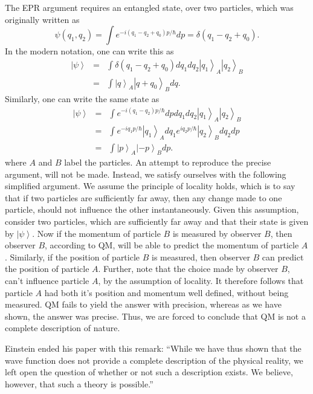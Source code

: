 
The EPR argument requires an entangled state, over two particles,
which was originally written as 
\[
\psi(q_{1},q_{2})=\int e^{-i(q_{1}-q_{2}+q_{0})p/\hbar}dp=\delta(q_{1}-q_{2}+q_{0}).
\]
In the modern notation, one can write this as 
\begin{eqnarray*}
\left|\psi\right\rangle  & = & \int\delta(q_{1}-q_{2}+q_{0})dq_{1}dq_{2}\left|q_{1}\right\rangle _{A}\left|q_{2}\right\rangle _{B}\\
 & = & \int\left|q\right\rangle _{A}\left|q+q_{0}\right\rangle _{B}dq.
\end{eqnarray*}
Similarly, one can write the same state as 
\begin{eqnarray*}
\left|\psi\right\rangle  & = & \int e^{-i(q_{1}-q_{2})p/\hbar}dpdq_{1}dq_{2}\left|q_{1}\right\rangle _{A}\left|q_{2}\right\rangle _{B}\\
 & = & \int e^{-iq_{1}p/\hbar}\left|q_{1}\right\rangle _{A}dq_{1}e^{iq_{2}p/\hbar}\left|q_{2}\right\rangle _{B}dq_{2}dp\\
 & = & \int\left|p\right\rangle _{A}\left|-p\right\rangle _{B}dp.
\end{eqnarray*}
where $A$ and $B$ label the particles. An attempt to reproduce the
precise argument, will not be made. Instead, we satisfy ourselves
with the following simplified argument. We assume the principle of
locality holds, which is to say that if two particles are sufficiently
far away, then any change made to one particle, should not influence
the other instantaneously. Given this assumption, consider two particles,
which are sufficiently far away and that their state is given by $\left|\psi\right\rangle $.
Now if the momentum of particle $B$ is measured by observer $B$,
then observer $B$, according to QM, will be able to predict the momentum
of particle $A$. Similarly, if the position of particle $B$ is measured,
then observer $B$ can predict the position of particle $A$. Further,
note that the choice made by observer $B$, can't influence particle
$A$, by the assumption of locality. It therefore follows that particle
$A$ had both it's position and momentum well defined, without being
measured. QM fails to yield the answer with precision, whereas as
we have shown, the answer was precise. Thus, we are forced to conclude
that QM is not a complete description of nature.

Einstein ended his paper with this remark: ``While we have thus shown
that the wave function does not provide a complete description of
the physical reality, we left open the question of whether or not
such a description exists. We believe, however, that such a theory
is possible.'' \cite{EinsteinEPR}


